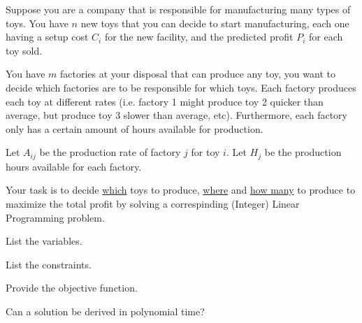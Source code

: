 \documentclass{article}
\begin{document}
\newpage
\begin{Question}
Suppose you are a company that is responsible for manufacturing many types of toys. You have $n$ new toys that you can decide to start manufacturing, each one having a setup cost $C_i$ for the new facility, and the predicted profit $P_i$ for each toy sold.

You have $m$ factories at your disposal that can produce any toy, you want to decide which factories are to be responsible for which toys. Each factory produces each toy at different rates (i.e. factory 1 might produce toy 2 quicker than average, but produce toy 3 slower than average, etc). Furthermore, each factory only has a certain amount of hours available for production.

Let $A_{ij}$ be the production rate of factory $j$ for toy $i$. Let $H_j$ be the production hours available for each factory.

Your task is to decide \underline{which} toys to produce, \underline{where} and \underline{how many} to produce to maximize the total profit by solving a correspinding (Integer) Linear Programming problem.

\begin{Subquestion}
List the variables.
\begin{makespace}
\vspace{30mm}
\end{makespace}
\end{Subquestion}

\begin{Subquestion}
List the constraints.
\begin{makespace}
\vspace{30mm}
\end{makespace}
\end{Subquestion}

\begin{Subquestion}
Provide the objective function.
\begin{makespace}
\vspace{30mm}
\end{makespace}
\end{Subquestion}

\begin{Subquestion}
Can a solution be derived in polynomial time?
\begin{makespace}
\vspace{30mm}
\end{makespace}
\end{Subquestion}
\end{Question}
\end{document}

